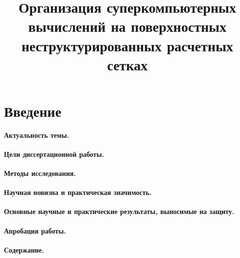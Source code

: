 \documentclass[a4paper,14pt]{extarticle}                     %
\numberwithin{equation}{section}                             %
\numberwithin{figure}{section}                               %
\numberwithin{table}{section}                                %
\theoremstyle{plain}                                         %
\numberwithin{theorem}{section}                              %
\numberwithin{lemma}{section}                                %
\numberwithin{definition}{section}                           %
\begin{document}
\title{Организация суперкомпьютерных вычислений на поверхностных неструктурированных расчетных сетках}
\author{}
\date{}
\maketitle
\thispagestyle{empty}                                        %

\newpage
\renewcommand{\contentsname}{Оглавление}                     %
\tableofcontents


\newpage
\section*{Введение}                      %


\paragraph{Актуальность темы.}

\paragraph{Цели диссертационной работы.}

\paragraph{Методы исследования.}

\paragraph{Научная новизна и практическая значимость.}

\paragraph{Основные научные и практические результаты, выносимые на защиту.}

\paragraph{Апробация работы.}

\paragraph{Содержание.}
\end{document}
